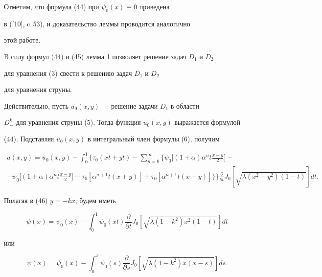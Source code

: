 Отметим, что формула (44) при $\psi_0(x)\equiv 0$ приведена


в ([10], c.\,53), и доказательство леммы проводится аналогично 


этой работе.





B силу формул (44) и (45) лемма 1 позволяет решение задач $D_1$ и $D_2$


для уравнения (3) свести к решению задач $D_1$ и $D_2$


для уравнения струны.





Действительно, пусть $u_0(x,y)$ --- решение задачи $D_1$ в области


$D_-^k$ для уравнения струны (5). Тогда функция $u_0(x,y)$ выражается формулой


(44). Подставляя $u_0(x,y)$ в интегральный член формулы (6), получим


\begin{multline}


u(x,y)=u_0(x,y)-\int_0^1 \bigg\{\tau_0(xt+yt)-\sum_{n=0}^{\infty}


\bigg\{\psi_0\bigg[(1+\alpha)\alpha ^nt\frac {x+y}{2}\bigg]-\\


%


-\psi_0\bigg[(1+\alpha)\alpha ^nt\frac {x-y}{2}\bigg]-


\tau_0 [\alpha ^{n+1}t(x+y)]+ 


\tau_0 [\alpha ^{n+1}t(x-y)]\bigg\}\bigg\}


\frac {\partial }


{\partial t}J_0[\sqrt {\lambda (x^2-y^2)(1-t)}]dt.


\end{multline}


Полагая в (46) $y=-kx$, будем иметь


$$


\psi (x)=\psi_0(x)-\int_0^1 \psi_0(xt)\frac {\partial }


{\partial t}J_0[\sqrt {\lambda (1-k^2)x^2(1-t)}]dt


$$


или


\begin{equation}


\psi (x)=\psi_0(x)-\int_0^x \psi_0(s)\frac {\partial }


{\partial s}J_0[\sqrt {\lambda (1-k^2)x(x-s)}]ds.


\end{equation}


